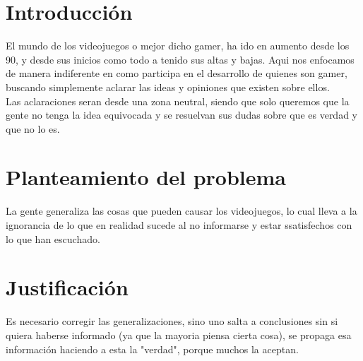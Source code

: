 \documentclass{bmcart}
\begin{document}


\section*{Introducción}
El mundo de los videojuegos o mejor dicho gamer, ha ido en aumento desde los 90, y desde sus inicios como todo a tenido sus altas y bajas. Aqui nos enfocamos de manera indiferente en como participa en el desarrollo de quienes son gamer, buscando simplemente aclarar las ideas y opiniones que existen sobre ellos.\\
Las aclaraciones seran desde una zona neutral, siendo que solo queremos que la gente no tenga la idea equivocada y se resuelvan sus dudas sobre que es verdad y que no lo es.

\section*{Planteamiento del problema}
La gente generaliza las cosas que pueden causar los videojuegos, lo cual lleva a la ignorancia de lo que en realidad sucede al no informarse y estar ssatisfechos con lo que han escuchado.

\section*{Justificación}
Es necesario corregir las generalizaciones, sino uno salta a conclusiones sin si quiera haberse informado (ya que la mayoria piensa cierta cosa), se propaga esa información haciendo a esta la "verdad", porque muchos la aceptan.
\end{document}
